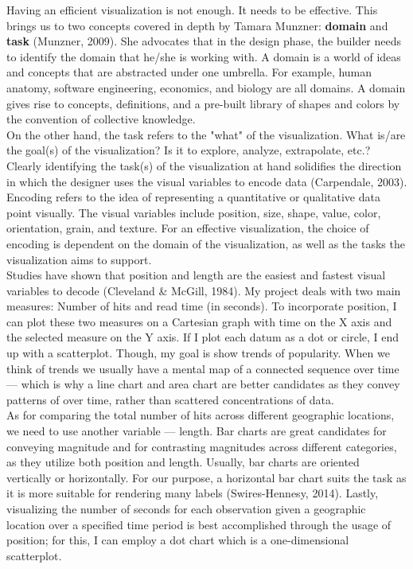 \documentclass[12pt]{article}
\begin{document}
Having an efficient visualization is not enough. It needs to be effective. This brings us to two concepts covered in depth by Tamara Munzner: \textbf{domain} and \textbf{task} (Munzner, 2009). She advocates that in the design phase, the builder needs to identify the domain that he/she is working with. A domain is a world of ideas and concepts that are abstracted under one umbrella. For example, human anatomy, software engineering, economics, and biology are all domains. A domain gives rise to concepts, definitions, and a pre-built library of shapes and colors by the convention of collective knowledge. \\
On the other hand, the task refers to the "what" of the visualization. What is/are the goal(s) of the visualization? Is it to explore, analyze, extrapolate, etc.? Clearly identifying the task(s) of the visualization at hand solidifies the direction in which the designer uses the visual variables to encode data (Carpendale, 2003). Encoding refers to the idea of representing a quantitative or qualitative data point visually. The visual variables include position, size, shape, value, color, orientation, grain, and texture. For an effective visualization, the choice of encoding is dependent on the domain of the visualization, as well as the tasks the visualization aims to support. \\
Studies have shown that position and length are the easiest and fastest visual variables to decode (Cleveland \& McGill, 1984). My project deals with two main measures: Number of hits and read time (in seconds). To incorporate position, I can plot these two measures on a Cartesian graph with time on the X axis and the selected measure on the Y axis. If I plot each datum as a dot or circle, I end up with a scatterplot. Though, my goal is show trends of popularity. When we think of trends we usually have a mental map of a connected sequence over time --- which is why a line chart and area chart are better candidates as they convey patterns of over time, rather than scattered concentrations of data. \\
\noindent As for comparing the total number of hits across different geographic locations, we need to use another variable --- length. Bar charts are great candidates for conveying magnitude and for contrasting magnitudes across different categories, as they utilize both position and length. Usually, bar charts are oriented vertically or horizontally. For our purpose, a horizontal bar chart suits the task as it is more suitable for rendering many labels (Swires-Hennesy, 2014). Lastly, visualizing the number of seconds for each observation given a geographic location over a specified time period is best accomplished through the usage of position; for this, I can employ a dot chart which is a one-dimensional scatterplot. \\
\end{document}
